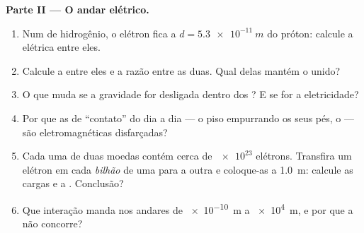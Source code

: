 \begin{problem}
\medskip
\noindent\textbf{Parte II --- O andar elétrico.}
\begin{enumerate}[resume]
  \item Num  de hidrogênio, o elétron fica a $d = \qty{5.3e-11}{m}$
        do próton: calcule a  elétrica entre eles.
  \item Calcule a  entre eles e a razão entre as duas.
        Qual delas mantém o  unido?
  \item O que muda se a gravidade for desligada dentro dos ? E se
        for a eletricidade?
  \item Por que as  de ``contato'' do dia a dia --- o piso
        empurrando os seus pés, o  --- são eletromagnéticas
        disfarçadas?
  \item Cada uma de duas moedas contém cerca de $\num{e23}$ elétrons.
        Transfira um elétron em cada \emph{bilhão} de uma para a outra e
        coloque-as a \qty{1.0}{m}: calcule as cargas e a . Conclusão?
  \item Que interação manda nos andares de \qty{e-10}{m} a \qty{e4}{m}, e
        por que a  não concorre?
\end{enumerate}


\end{problem}
